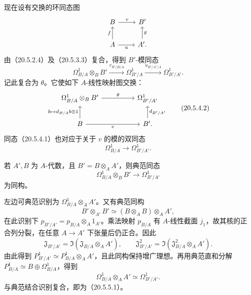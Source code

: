 现在设有交换的环同态图
\[
\begin{tikzcd}
 B\arrow[r,"v"]&B'\\
 A\arrow[u,"f"]\arrow[r,"u"']&A'\arrow[u,"g"'].
\end{tikzcd}
\]
由（20.5.2.4）及（20.5.3.3）复合，得到 $B'$-模同态
\begin{equation}
 \Omega^1_{B/A}\otimes_B B'
 \xrightarrow{v_{B'/B/A}}\Omega^1_{B'/A}
 \xrightarrow{u_{B'/A'/A}}\Omega^1_{B'/A'}.
 \tag{20.5.4.1}
\end{equation}
记此复合为 $\theta$。它使如下 $A$-线性映射图交换：
\begin{equation}
\begin{tikzcd}[column sep=huge]
 \Omega^1_{B/A}\otimes_B B'\arrow[r,"\theta"]&\Omega^1_{B'/A'}\\
 B\arrow[u,"{b\mapsto d_{B/A}b\otimes1}"]\arrow[r,"v"']&B'\arrow[u,"d_{B'/A'}"'].
\end{tikzcd}
\tag{20.5.4.2}
\end{equation}
同态（20.5.4.1）也对应于关于 $v$ 的模的双同态
\begin{equation}
 \Omega^1_{B/A}\longrightarrow\Omega^1_{B'/A'}.
 \tag{20.5.4.3}
\end{equation}

若 $A',B$ 为 $A$-代数，且 $B'=B\otimes_A A'$，则典范同态
\begin{equation}
 \Omega^1_{B/A}\otimes_B B'\longrightarrow\Omega^1_{B'/A'}
 \tag{20.5.5.1}
\end{equation}
为同构。

左边可典范识别为 $\Omega^1_{B/A}\otimes_A A'$。又有典范同构
\[
 B'\otimes_{A'}B'\simeq(B\otimes_A B)\otimes_A A',
\]
在此识别下 $p_{B'/A'}=p_{B/A}\otimes_A1_{A'}$。乘法映射 $p_{B/A}$ 有 $A$-线性截面 $j_1$，故其核的正合列分裂，在任意 $A\to A'$ 下张量后仍正合。因此
\[
 \mathfrak J_{B'/A'}=\Im(\mathfrak J_{B/A}\otimes_A A'),\qquad
 \mathfrak J_{B'/A'}^2=\Im(\mathfrak J_{B/A}^2\otimes_A A').
\]
由此得到 $P^1_{B'/A'}\simeq P^1_{B/A}\otimes_A A'$，且此同构保持增广理想。再用典范直和分解 $P^1_{B/A}\simeq B\oplus\Omega^1_{B/A}$，得到
\begin{equation}
 \Omega^1_{B/A}\otimes_A A'\simeq\Omega^1_{B'/A'}.
 \tag{20.5.5.2}
\end{equation}
与典范结合识别复合，即为（20.5.5.1）。

